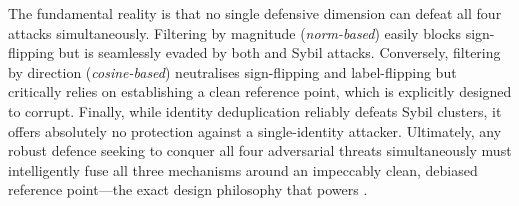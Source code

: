 \documentclass[../main]{subfiles}
\begin{document}
The fundamental reality is that no single defensive dimension can defeat all four attacks simultaneously. Filtering by magnitude (\emph{norm-based}) easily blocks sign-flipping but is seamlessly evaded by both \ipm{} and Sybil attacks. Conversely, filtering by direction (\emph{cosine-based}) neutralises sign-flipping and label-flipping but critically relies on establishing a clean reference point, which \ipm{} is explicitly designed to corrupt. Finally, while identity deduplication reliably defeats Sybil clusters, it offers absolutely no protection against a single-identity \ipm{} attacker. Ultimately, any robust defence seeking to conquer all four adversarial threats simultaneously must intelligently fuse all three mechanisms around an impeccably clean, debiased reference point---the exact design philosophy that powers \aegis{}.
\end{document}
